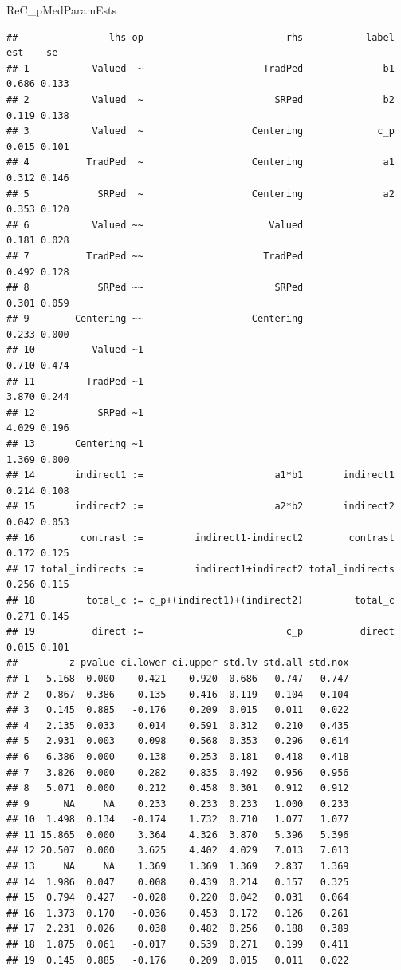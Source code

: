 \documentclass[
  11pt,
]{book}
\newenvironment{Shaded}{\begin{snugshade}}{\end{snugshade}}
\newcommand{\NormalTok}[1]{#1}
\begin{document}
\begin{Shaded}
\begin{Highlighting}[]
\NormalTok{ReC\_pMedParamEsts}
\end{Highlighting}
\end{Shaded}

\begin{verbatim}
##                lhs op                         rhs           label   est    se
## 1           Valued  ~                     TradPed              b1 0.686 0.133
## 2           Valued  ~                       SRPed              b2 0.119 0.138
## 3           Valued  ~                   Centering             c_p 0.015 0.101
## 4          TradPed  ~                   Centering              a1 0.312 0.146
## 5            SRPed  ~                   Centering              a2 0.353 0.120
## 6           Valued ~~                      Valued                 0.181 0.028
## 7          TradPed ~~                     TradPed                 0.492 0.128
## 8            SRPed ~~                       SRPed                 0.301 0.059
## 9        Centering ~~                   Centering                 0.233 0.000
## 10          Valued ~1                                             0.710 0.474
## 11         TradPed ~1                                             3.870 0.244
## 12           SRPed ~1                                             4.029 0.196
## 13       Centering ~1                                             1.369 0.000
## 14       indirect1 :=                       a1*b1       indirect1 0.214 0.108
## 15       indirect2 :=                       a2*b2       indirect2 0.042 0.053
## 16        contrast :=         indirect1-indirect2        contrast 0.172 0.125
## 17 total_indirects :=         indirect1+indirect2 total_indirects 0.256 0.115
## 18         total_c := c_p+(indirect1)+(indirect2)         total_c 0.271 0.145
## 19          direct :=                         c_p          direct 0.015 0.101
##         z pvalue ci.lower ci.upper std.lv std.all std.nox
## 1   5.168  0.000    0.421    0.920  0.686   0.747   0.747
## 2   0.867  0.386   -0.135    0.416  0.119   0.104   0.104
## 3   0.145  0.885   -0.176    0.209  0.015   0.011   0.022
## 4   2.135  0.033    0.014    0.591  0.312   0.210   0.435
## 5   2.931  0.003    0.098    0.568  0.353   0.296   0.614
## 6   6.386  0.000    0.138    0.253  0.181   0.418   0.418
## 7   3.826  0.000    0.282    0.835  0.492   0.956   0.956
## 8   5.071  0.000    0.212    0.458  0.301   0.912   0.912
## 9      NA     NA    0.233    0.233  0.233   1.000   0.233
## 10  1.498  0.134   -0.174    1.732  0.710   1.077   1.077
## 11 15.865  0.000    3.364    4.326  3.870   5.396   5.396
## 12 20.507  0.000    3.625    4.402  4.029   7.013   7.013
## 13     NA     NA    1.369    1.369  1.369   2.837   1.369
## 14  1.986  0.047    0.008    0.439  0.214   0.157   0.325
## 15  0.794  0.427   -0.028    0.220  0.042   0.031   0.064
## 16  1.373  0.170   -0.036    0.453  0.172   0.126   0.261
## 17  2.231  0.026    0.038    0.482  0.256   0.188   0.389
## 18  1.875  0.061   -0.017    0.539  0.271   0.199   0.411
## 19  0.145  0.885   -0.176    0.209  0.015   0.011   0.022
\end{verbatim}
\end{document}
